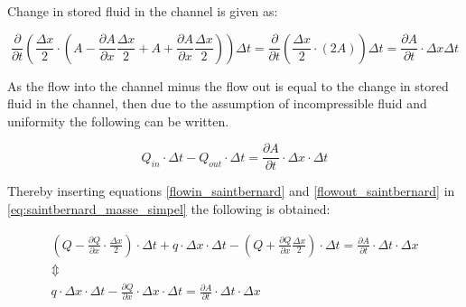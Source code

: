 Change in stored fluid in the channel is given as:

\begin{equation}\label{stored_saintbernard}
\frac{\partial}{\partial t} \left(\frac{\Delta x}{2} \cdot \left(A- \frac{\partial A}{\partial x} \frac{\Delta x}{2} +A + \frac{\partial A}{\partial x} \frac{\Delta x}{2}	\right) \right) \Delta t = \frac{\partial}{\partial t} \left(\frac{\Delta x}{2} \cdot \left( 2 A	\right) \right) \Delta t = \frac{\partial A}{\partial t} \cdot \Delta x	\Delta t
\end{equation}


As the flow into the channel minus the flow out is equal to the change in stored fluid in the channel, then due to the assumption of incompressible fluid and uniformity the following can be written.  

\begin{equation}\label{eq:saintbernard_masse_simpel}
	Q_{in}\cdot \Delta t - Q_{out}\cdot \Delta t = \frac{\partial A}{\partial t} \cdot \Delta x	\cdot \Delta t
\end{equation}

Thereby inserting equations \ref{flowin_saintbernard} and \ref{flowout_saintbernard} in \ref{eq:saintbernard_masse_simpel} the following is obtained:

\begin{equation}
\begin{array}{l}
	\left(Q - \frac{\partial Q}{\partial x}\cdot \frac{\Delta x}{2}\right) \cdot \Delta t + q \cdot \Delta x \cdot \Delta t - \left(Q + \frac{\partial Q}{ \partial x} \frac{\Delta x}{2} \right) \cdot \Delta t  = \frac{\partial A}{\partial t}\cdot \Delta t 
	\cdot \Delta x \\ 
\Updownarrow \\
q \cdot \Delta x \cdot \Delta t  - \frac{\partial Q}{\partial x} \cdot \Delta x \cdot \Delta t  = \frac{\partial A}{\partial t} \cdot \Delta t 
	\cdot \Delta x 
\end{array}
\label{saintbernard_masse}
\end{equation}

